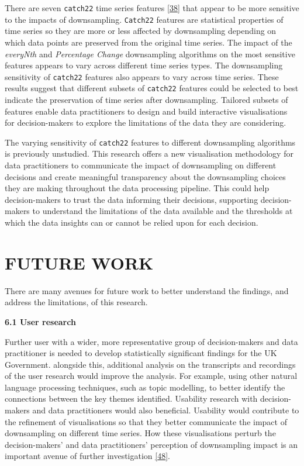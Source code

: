 \documentclass{article}
\begin{document}
There are seven \texttt{catch22} time series features
\protect\hyperlink{ref-catch22}{{[}38{]}} that appear to be more
sensitive to the impacts of downsampling. \texttt{Catch22} features are
statistical properties of time series so they are more or less affected
by downsampling depending on which data points are preserved from the
original time series. The impact of the \emph{everyNth} and
\emph{Percentage Change} downsampling algorithms on the most sensitive
features appears to vary across different time series types. The
downsampling sensitivity of \texttt{catch22} features also appears to
vary across time series. These results suggest that different subsets of
\texttt{catch22} features could be selected to best indicate the
preservation of time series after downsampling. Tailored subsets of
features enable data practitioners to design and build interactive
visualisations for decision-makers to explore the limitations of the
data they are considering.

The varying sensitivity of \texttt{catch22} features to different
downsampling algorithms is previously unstudied. This research offers a
new visualisation methodology for data practitioners to communicate the
impact of downsampling on different decisions and create meaningful
transparency about the downsampling choices they are making throughout
the data processing pipeline. This could help decision-makers to trust
the data informing their decisions, supporting decision-makers to
understand the limitations of the data available and the thresholds at
which the data insights can or cannot be relied upon for each decision.

\hypertarget{future-work}{%
\section{FUTURE WORK}\label{future-work}}

There are many avenues for future work to better understand the
findings, and address the limitations, of this research.

\textbf{6.1 User research}

Further user with a wider, more representative group of decision-makers
and data practitioner is needed to develop statistically significant
findings for the UK Government. alongside this, additional analysis on
the transcripts and recordings of the user research would improve the
analysis. For example, using other natural language processing
techniques, such as topic modelling, to better identify the connections
between the key themes identified. Usability research with
decision-makers and data practitioners would also beneficial. Usability
would contribute to the refinement of visualisations so that they better
communicate the impact of downsampling on different time series. How
these visualisations perturb the decision-makers' and data
practitioners' perception of downsampling impact is an important avenue
of further investigation
\protect\hyperlink{ref-graphsampling}{{[}48{]}}.
\end{document}

